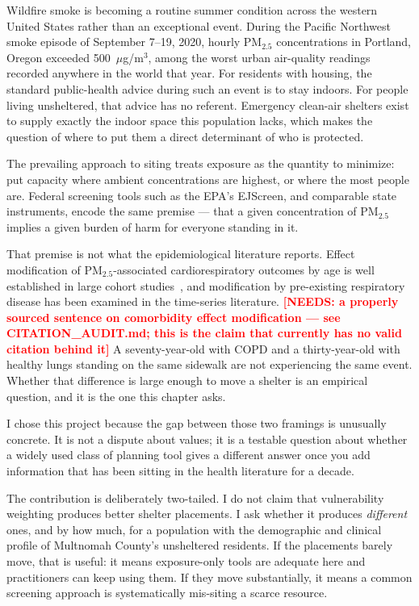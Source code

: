 \documentclass[graybox]{svmult}
\newcommand{\NEEDS}[1]{\textcolor{red}{\textbf{[NEEDS: #1]}}}
\begin{document}
Wildfire smoke is becoming a routine summer condition across the western United
States rather than an exceptional event. During the Pacific Northwest smoke
episode of September 7--19, 2020, hourly PM$_{2.5}$ concentrations in Portland,
Oregon exceeded 500~$\mu$g/m$^3$, among the worst urban air-quality readings
recorded anywhere in the world that year. For residents with housing, the
standard public-health advice during such an event is to stay indoors. For people
living unsheltered, that advice has no referent. Emergency clean-air shelters
exist to supply exactly the indoor space this population lacks, which makes the
question of where to put them a direct determinant of who is protected.

The prevailing approach to siting treats exposure as the quantity to minimize:
put capacity where ambient concentrations are highest, or where the most people
are. Federal screening tools such as the EPA's EJScreen, and comparable state
instruments, encode the same premise --- that a given concentration of PM$_{2.5}$
implies a given burden of harm for everyone standing in it.

That premise is not what the epidemiological literature reports. Effect
modification of PM$_{2.5}$-associated cardiorespiratory outcomes by age is well
established in large cohort studies~\cite{di2017}, and modification by
pre-existing respiratory disease has been examined in the time-series literature.
\NEEDS{a properly sourced sentence on comorbidity effect modification --- see
CITATION\_AUDIT.md; this is the claim that currently has no valid citation behind
it} A seventy-year-old with COPD and a thirty-year-old with healthy lungs
standing on the same sidewalk are not experiencing the same
event. Whether that difference is large enough to move
a shelter is an empirical question, and it is the one this chapter asks.

I chose this project because the gap between those two framings is unusually
concrete. It is not a dispute about values; it is a testable question about
whether a widely used class of planning tool gives a different answer once you
add information that has been sitting in the health literature for a decade.

The contribution is deliberately two-tailed. I do not claim that vulnerability
weighting produces better shelter placements. I ask whether it produces
\emph{different} ones, and by how much, for a population with the demographic and
clinical profile of Multnomah County's unsheltered residents. If the placements
barely move, that is useful: it means exposure-only tools are adequate here and
practitioners can keep using them. If they move substantially, it means a common
screening approach is systematically mis-siting a scarce resource.
\end{document}
